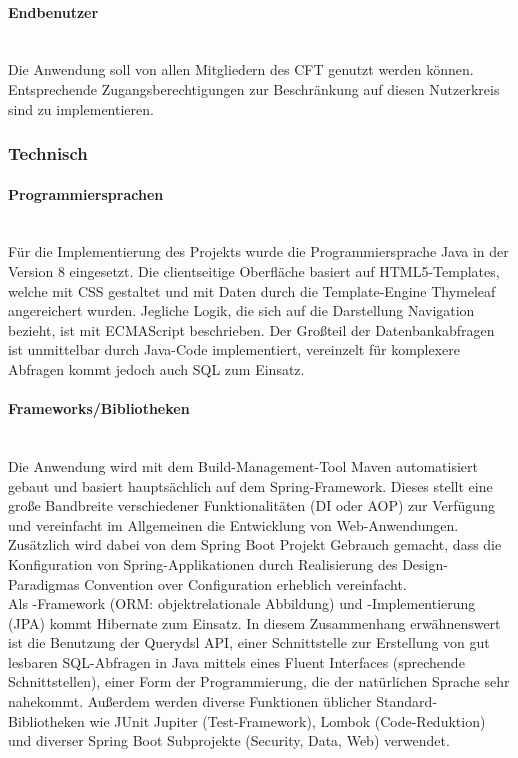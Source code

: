 \paragraph{Endbenutzer} ~\\
\label{p:Endbenutzer}
Die Anwendung \projektName soll von allen Mitgliedern des \ac{CFT} \teamName genutzt werden können. Entsprechende Zugangsberechtigungen zur Beschränkung auf diesen Nutzerkreis sind zu implementieren.

\subsubsection{Technisch} 
\label{sec:Projektschnittstellen:Technisch}

\paragraph{Programmiersprachen} ~\\
\label{p:Programmiersprachen}
Für die Implementierung des Projekts wurde die Programmiersprache Java in der Version 8 eingesetzt. Die clientseitige Oberfläche basiert auf HTML5-Templates, welche mit CSS gestaltet und mit Daten durch die Template-Engine Thymeleaf angereichert wurden. Jegliche Logik, die sich auf die Darstellung \bzw Navigation bezieht, ist mit ECMAScript beschrieben. Der Großteil der Datenbankabfragen ist unmittelbar durch Java-Code implementiert, vereinzelt für komplexere Abfragen kommt jedoch auch SQL zum Einsatz.

\paragraph{Frameworks/Bibliotheken} ~\\
\label{p:Frameworks}
Die Anwendung wird mit dem Build-Management-Tool Maven automatisiert gebaut und basiert hauptsächlich auf dem Spring-Framework. Dieses stellt eine große Bandbreite verschiedener Funktionalitäten (\zB \ac{DI} oder \ac{AOP}) zur Verfügung und vereinfacht im Allgemeinen die Entwicklung von Web-Anwendungen.\\
Zusätzlich wird dabei von dem Spring Boot Projekt Gebrauch gemacht, dass die Konfiguration von Spring-Applikationen durch Realisierung des Design-Paradigmas Convention over Configuration erheblich vereinfacht.\\
Als -Framework (\ac{ORM}: objektrelationale Abbildung) und -Implementierung (\ac{JPA}) kommt Hibernate zum Einsatz. In diesem Zusammenhang erwähnenswert ist die Benutzung der Querydsl API, einer Schnittstelle zur Erstellung von gut lesbaren SQL-Abfragen in Java mittels eines Fluent Interfaces (sprechende Schnittstellen), einer Form der Programmierung, die der natürlichen Sprache sehr nahekommt.
Außerdem werden diverse Funktionen üblicher Standard-Bibliotheken wie JUnit Jupiter (Test-Framework), Lombok (Code-Reduktion) und diverser Spring Boot Subprojekte (Security, Data, Web) verwendet.


